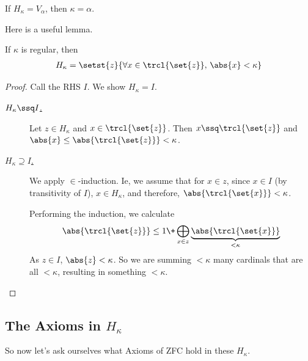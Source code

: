 \begin{boxlemma}
    If $H_{\kappa} = V_{\alpha}$, then $\kappa = \alpha$. 
\end{boxlemma}

Here is a useful lemma.

\begin{boxlemma}
    If $\kappa$ is regular, then
    \begin{align*}
        H_{\kappa} = \setst{z}{\forall x \in \trcl{\set{z}}, \, \abs{x} < \kappa}
    \end{align*}
\end{boxlemma}
\begin{proof}
    Call the RHS $I$. We show $H_{\kappa} = I$.

    \begin{description}
        \item[\underline{$H_{\kappa} \ssq I$.}] Let $z \in H_{\kappa}$ and $x \in \trcl{\set{z}}$. Then $x \ssq \trcl{\set{z}}$ and $\abs{x} \le \abs{\trcl{\set{z}}} < \kappa$.

        \item[\underline{$H_{\kappa} \supseteq I$.}] We apply $\in$-induction. Ie, we assume that for $x \in z$, since $x \in I$ (by transitivity of $I$), $x \in H_{\kappa}$, and therefore, $\abs{\trcl{\set{x}}} < \kappa$.

        Performing the induction, we calculate
        \begin{align*}
            \abs{\trcl{\set{z}}} \le 1 \+ \bigoplus_{x \in z} \underbrace{\abs{\trcl{\set{x}}}}_{< \kappa}
        \end{align*}
        As $z \in I$, $\abs{z} < \kappa$. So we are summing $< \kappa$ many cardinals that are all $< \kappa$, resulting in something $< \kappa$.
    \end{description}
\end{proof}

\subsection{The Axioms in $H_{\kappa}$}

So now let's ask ourselves what Axioms of ZFC hold in these $H_{\kappa}$.

